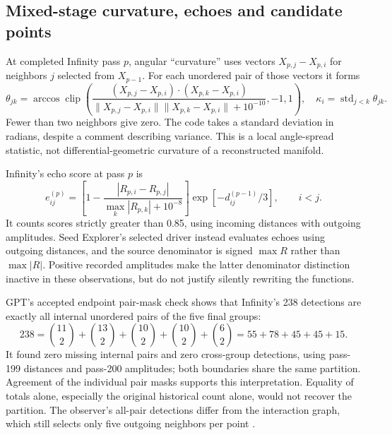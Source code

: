 \documentclass[11pt,a4paper]{article}
\begin{document}
\subsection{Mixed-stage curvature, echoes and candidate points}
At completed Infinity pass $p$, angular ``curvature'' uses vectors $X_{p,j}-X_{p,i}$ for neighbors $j$ selected from $X_{p-1}$. For each unordered pair of those vectors it forms
\begin{equation}
\theta_{jk}=\arccos\operatorname{clip}\!\left(
\frac{(X_{p,j}-X_{p,i})\cdot(X_{p,k}-X_{p,i})}
{\|X_{p,j}-X_{p,i}\|\|X_{p,k}-X_{p,i}\|+10^{-10}},-1,1\right),\quad
\kappa_i=\operatorname{std}_{j<k}\theta_{jk}.\label{eq:curv}
\end{equation}
Fewer than two neighbors give zero. The code takes a standard deviation in radians, despite a comment describing variance. This is a local angle-spread statistic, not differential-geometric curvature of a reconstructed manifold.

Infinity's echo score at pass $p$ is
\begin{equation}
e_{ij}^{(p)}=\left[1-\frac{|R_{p,i}-R_{p,j}|}{\max_k|R_{p,k}|+10^{-8}}\right]
\exp[-d_{ij}^{(p-1)}/3],\qquad i<j.\label{eq:echo5}
\end{equation}
It counts scores strictly greater than 0.85, using incoming distances with outgoing amplitudes. Seed Explorer's selected driver instead evaluates echoes using outgoing distances, and the source denominator is signed $\max R$ rather than $\max|R|$. Positive recorded amplitudes make the latter denominator distinction inactive in these observations, but do not justify silently rewriting the functions.

GPT's accepted endpoint pair-mask check shows that Infinity's 238 detections are exactly all internal unordered pairs of the five final groups:
\begin{equation}
238=\binom{11}{2}+\binom{13}{2}+\binom{10}{2}+\binom{10}{2}+\binom{6}{2}
=55+78+45+45+15.\label{eq:238}
\end{equation}
It found zero missing internal pairs and zero cross-group detections, using pass-199 distances and pass-200 amplitudes; both boundaries share the same partition. Agreement of the individual pair masks supports this interpretation. Equality of totals alone, especially the original historical count alone, would not recover the partition. The observer's all-pair detections differ from the interaction graph, which still selects only five outgoing neighbors per point \cite{review5}.
\end{document}
